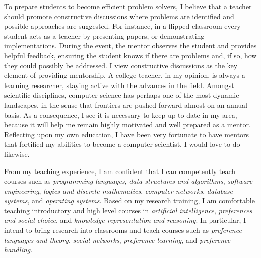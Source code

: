 \documentclass[12pt]{article}
\newcommand{\tit}[1]{\textit{#1}}
\begin{document}
To prepare students to become efficient problem solvers, 
I believe that a teacher should promote
constructive discussions where problems are identified and possible approaches are suggested.
For instance, in a flipped classroom every student acts as a teacher by presenting papers,
or demonstrating implementations.  During the event, the mentor observes the student and
provides helpful feedback, ensuring the student knows if there are problems and, if so,
how they could possibly be addressed.
I view constructive discussions as the key element of providing mentorship.
A college teacher, in my opinion, is always a learning researcher, staying
active with the advances in the field.
Amongst scientific disciplines,
computer science has perhaps one of the most dynamic landscapes, in the sense that
frontiers are pushed forward almost on an annual basis.
As a consequence, I see it is necessary to keep up-to-date in my area,
because it will help me remain highly motivated and well prepared as a mentor.
Reflecting upon my own education, I have been very fortunate to have mentors
that fortified my abilities to become a computer scientist.
I would love to do likewise.

From my teaching experience, I am confident that I can competently teach courses such as
\tit{programming languages}, \tit{data structures and algorithms}, \tit{software engineering},
\tit{logics and discrete mathematics},
\tit{computer networks}, \tit{database systems}, and \tit{operating systems}.
Based on my research training, I am comfortable teaching introductory and high 
level courses in \tit{artificial intelligence},
\tit{preferences and social choice}, and \tit{knowledge representation and reasoning}.
In particular, I intend to bring research into classrooms and teach courses such as
\tit{preference languages and theory}, \tit{social networks},
\tit{preference learning}, and \tit{preference handling}.
\end{document}
